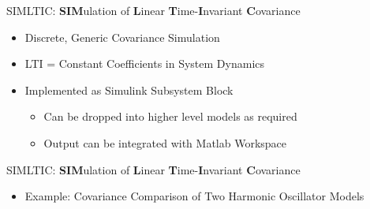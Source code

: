 
\begin{frame}
SIMLTIC: \textbf{SIM}ulation of \textbf{L}inear \textbf{T}ime-\textbf{I}nvariant \textbf{C}ovariance
\begin{itemize}
  \item Discrete, Generic Covariance Simulation
  \item LTI = Constant Coefficients in System Dynamics
  \item Implemented as Simulink Subsystem Block
	\begin{itemize}
		\item Can be dropped into higher level models as required
		\item Output can be integrated with Matlab Workspace
	\end{itemize}
\end{itemize} 
\end{frame}

\begin{frame}
\end{frame}

\begin{frame}
SIMLTIC: \textbf{SIM}ulation of \textbf{L}inear \textbf{T}ime-\textbf{I}nvariant \textbf{C}ovariance
\begin{itemize}
  \item Example:  Covariance Comparison of Two Harmonic Oscillator Models
\end{itemize} 
\end{frame}

\begin{frame}
\end{frame}

\begin{frame}
\end{frame}

\begin{frame}
\end{frame}

\begin{frame}
\end{frame}


\begin{frame}
\end{frame}

